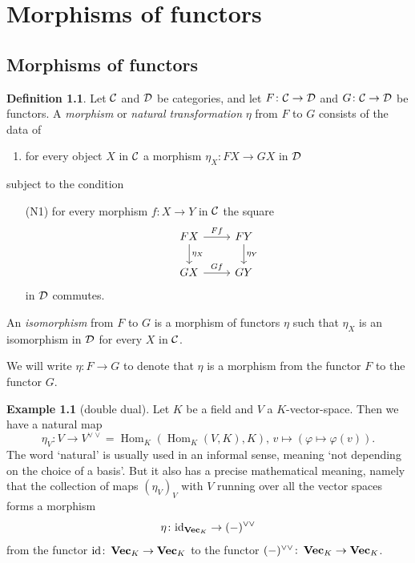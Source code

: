 \documentclass[11pt]{amsbook}
\DeclareMathOperator\Hom{Hom}
\renewcommand{\Vec}{\operatorname{{\bf{Vec}}}}
\def\id{{\rm id}}
\theoremstyle{plain}
\theoremstyle{definition}
\newtheorem{definition}[theorem]{Definition}
\newtheorem{example}[theorem]{Example}
\begin{document}
\chapter{Morphisms of functors}

\section{Morphisms of functors}


\begin{definition}
Let ${\mathcal{C}}$ and ${\mathcal{D}}$ be categories, and let $F\colon {\mathcal{C}}\to {\mathcal{D}}$ and $G\colon {\mathcal{C}} \to {\mathcal{D}}$ be functors. A \emph{morphism} or \emph{natural transformation} $\eta$ from $F$ to $G$ consists of the data of
\begin{enumerate}
\item for every object $X$ in ${\mathcal{C}}$ a morphism $\eta_X \colon FX \to GX$ in ${\mathcal{D}}$
\end{enumerate}
subject to the condition 
\begin{enumerate}
\item[(N1)]  for every morphism $f\colon X\to Y$ in ${\mathcal{C}}$ the square
\[
\begin{tikzcd}
FX \arrow{r}{Ff} \arrow{d}{\eta_X} & FY \arrow{d}{\eta_Y} \\
GX \arrow{r}{Gf} & GY
\end{tikzcd}
\]
in ${\mathcal{D}}$ commutes.
\end{enumerate}
An \emph{isomorphism} from $F$ to $G$ is a morphism of functors $\eta$ such that $\eta_X$ is an isomorphism in ${\mathcal{D}}$ for every $X$ in ${\mathcal{C}}$.
\end{definition}

We will  write $\eta\colon F\to G$ to denote that $\eta$ is a morphism from the functor $F$ to the functor $G$.

\begin{example}[double dual]
Let $K$ be a field and $V$ a $K$-vector-space. Then we have a natural map
\[
	\eta_V\colon V \to V^{\vee\vee} = \Hom_K(\Hom_K(V,K),K),\,
	v \mapsto \left( \varphi \mapsto \varphi(v) \right).
\]
The word `natural' is usually used in an informal sense, meaning `not depending on the choice of a basis'. But it also has a precise mathematical meaning, namely that the collection of maps $(\eta_V)_V$ with $V$ running over all the vector spaces forms a morphism
\[
	\eta\colon \id_{\Vec_K} \to (-)^{\vee\vee}
\]
from the functor $\id\colon \Vec_K \to \Vec_K$ to the functor $(-)^{\vee\vee}\colon \Vec_K \to \Vec_K$.
\end{example}
\end{document}

